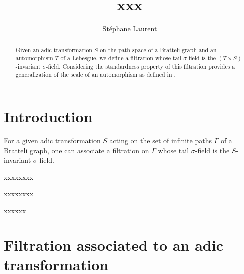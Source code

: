 \documentclass[12pt,a4paper]{article}
\author{Stéphane Laurent}
\title{xxx}
\begin{document}
\theoremstyle{defstyle}
\newtheorem{definition}{Definition}
\newtheorem{remark}{Remark}
\newtheorem{question}{Question}
\newtheorem{clarify}{To clarify}
\theoremstyle{thmstyle}
\newtheorem{thm}{Theorem}[section]
\newtheorem{ppsition}{Proposition}
\newtheorem{lemma}{Lemma}

\newcommand{\FF}{\mathcal{F}}
\newcommand{\GG}{\mathcal{G}}
\newcommand{\EE}{\mathbb{E}}
\newcommand{\II}{\mathcal{I}}
\newcommand{\LL}{\mathcal{L}}
\newcommand{\OO}{\mathcal{O}}
\newcommand{\XX}{\mathcal{X}}
\newcommand{\given}{\mid}
\newcommand{\eps}{\epsilon}
\newcommand{\indic}{\boldsymbol 1}
\newcommand{\Vb}{\boldsymbol V}
\newcommand{\tildV}{\widetilde{V}}
\newcommand{\tildW}{\widetilde{W}}
\newcommand{\tildX}{\widetilde{X}}
\newcommand{\tildeps}{\widetilde{\epsilon}}


\newcommand{\indvee}{\dot{\vee}}
\newcommand{\indep}{\mathrel{\text{\scalebox{1.07}{$\perp\mkern-10mu\perp$}}}}

\maketitle

\begin{abstract}
Given an adic transformation $S$ on the path space of a Bratteli graph and 
an automorphism $T$ of a Lebesgue, we define a filtration whose 
tail $\sigma$-field is the $(T \times S)$-invariant $\sigma$-field. 
Considering the standardness property of this filtration provides 
a generalization of the scale of an automorphism as defined in 
\cite{LauXLV}.
\end{abstract}

\section{Introduction} 

For a given adic transformation $S$ acting on the set of infinite paths $\Gamma$ of a 
Bratteli graph, one can associate a filtration on $\Gamma$ whose 
tail $\sigma$-field is the $S$-invariant $\sigma$-field. 

xxxxxxxx

xxxxxxxx

xxxxxx

\section{Filtration associated to an adic transformation} 
\end{document}

